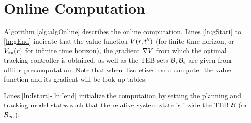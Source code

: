 \section{Online Computation \label{sec:online}}
Algorithm \ref{alg:algOnline} describes the online computation. 
Lines \ref{ln:gStart} to \ref{ln:gEnd} indicate that the value function $V(r,t'')$ (for finite time horizon, or $V_\infty(r)$ for infinite time horizon), the gradient $\nabla V$ from which the optimal tracking controller is obtained, as well as the TEB sets $\mathcal B,\mathcal B_e$ are given from offline precomputation. 
Note that when discretized on a computer the value function and its gradient will be look-up tables.

Lines \ref{ln:Istart}-\ref{ln:Iend} initialize the computation by setting the planning and tracking model states such that the relative system state is inside the TEB $\mathcal B$ (or $\mathcal B_\infty$). 

